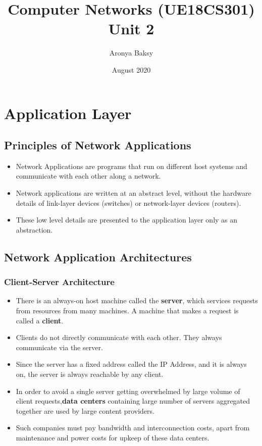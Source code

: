 \documentclass{article}
\title{Computer Networks (UE18CS301)\\
 \large Unit 2
 }
\author{Aronya Baksy}
\date{August 2020}
\theoremstyle{plain}
\theoremstyle{definition}
\begin{document}
\maketitle

\section{Application Layer}
\subsection{Principles of Network Applications}
\begin{itemize}
    \item Network Applications are programs that run on different host systems and communicate with each other along a network.
    
    \item Network applications are written at an abstract level, without the hardware details of link-layer devices (switches) or network-layer devices (routers). 
    
    \item These low level details are presented to the application layer only as an abstraction.
\end{itemize}

\subsection{Network Application Architectures}
\subsubsection{Client-Server Architecture}
\begin{itemize}
    \item There is an always-on host machine called the \textbf{server}, which services requests from resources from many machines. A machine that makes a request is called a \textbf{client}.
    
    \item Clients do not directly communicate with each other. They always communicate via the server.
    
    \item Since the server has a fixed address called the IP Address, and it is always on, the server is always reachable by any client. 
    
    \item In order to avoid a single server getting overwhelmed by large volume of client requests,\textbf{data centers} containing large number of servers aggregated together are used by large content providers. 
    
    \item Such companies must pay bandwidth and interconnection costs, apart from maintenance and power costs for upkeep of these data centers. 
\end{itemize}
\end{document}
